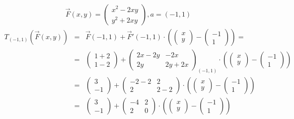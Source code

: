\documentclass{../../myassignment}
\begin{document}
		\begin{answer}
			\begin{eqnarray*}
				\vec{F}(x,y) = \begin{pmatrix} x^2-2xy \\ y^2 + 2xy \end{pmatrix}, a=(-1,1)
			\end{eqnarray*}
			\begin{eqnarray*}
				T_{(-1,1)}(\vec{F}(x,y)) &=& \vec{F}(-1,1) + \vec{F}'(-1,1) \cdot (\begin{pmatrix} x\\y \end{pmatrix} - \begin{pmatrix} -1\\1 \end{pmatrix}) = \\
										&=& \begin{pmatrix} 1+2\\1-2 \end{pmatrix} + \begin{pmatrix} 2x-2y & -2x \\ 2y & 2y+2x \end{pmatrix}_{(-1,1)} \cdot (\begin{pmatrix} x\\y \end{pmatrix} - \begin{pmatrix} -1\\1 \end{pmatrix})\\
										&=& \begin{pmatrix} 3 \\ -1 \end{pmatrix} + \begin{pmatrix} -2-2 & 2 \\ 2 & 2-2 \end{pmatrix} \cdot (\begin{pmatrix} x\\y \end{pmatrix} - \begin{pmatrix} -1\\1 \end{pmatrix})\\
										&=& \begin{pmatrix} 3 \\ -1 \end{pmatrix} + \begin{pmatrix} -4 & 2 \\ 2 & 0 \end{pmatrix} \cdot (\begin{pmatrix} x\\y \end{pmatrix} - \begin{pmatrix} -1\\1 \end{pmatrix})\\

\end{eqnarray*}
\end{answer}
\end{document}
